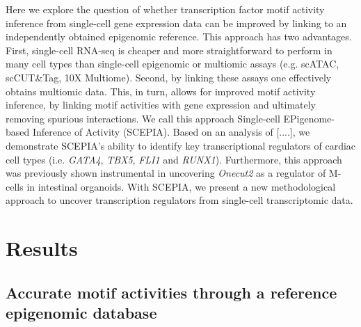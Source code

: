 Here we explore the question of whether transcription factor motif activity inference from single-cell gene expression data can be improved by linking to an independently obtained epigenomic reference. This approach has two advantages. First, single-cell RNA-seq is cheaper and more straightforward to perform in many cell types than single-cell epigenomic or multiomic assays (e.g. scATAC, scCUT\&Tag, 10X Multiome). Second, by linking these assays one effectively obtains multiomic data. This, in turn, allows for improved motif activity inference, by linking motif activities with gene expression and ultimately removing spurious interactions. We call this approach Single-cell EPigenome-based Inference of Activity (SCEPIA). Based on an analysis of  [....], we demonstrate SCEPIA's ability to identify key transcriptional regulators of cardiac cell types (i.e. \textit{GATA4}, \textit{TBX5}, \textit{FLI1} and \textit{RUNX1}). Furthermore, this approach was previously shown instrumental in uncovering \textit{Onecut2} as a regulator of M-cells in intestinal organoids\cite{LunaVelez2023}. With SCEPIA, we present a new methodological approach to uncover transcription regulators from single-cell transcriptomic data. 

\section{Results}

\subsection{Accurate motif activities through a reference epigenomic database}

